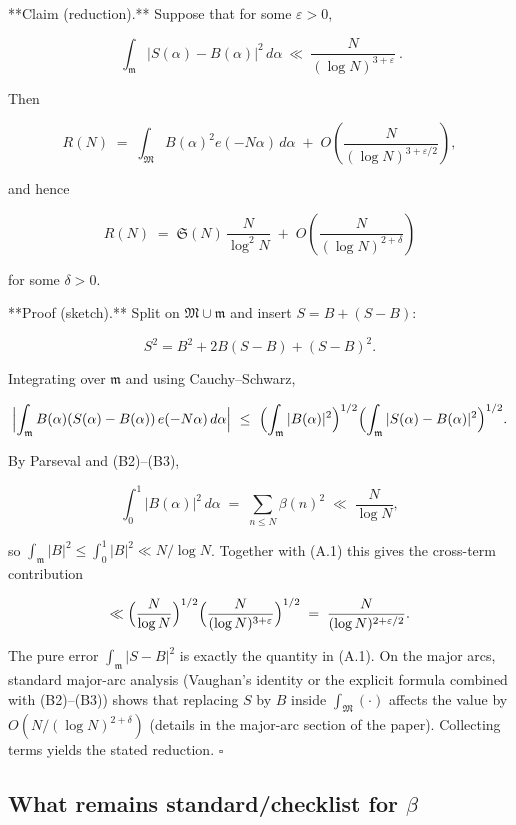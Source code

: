 \documentclass[11pt]{article}
\theoremstyle{definition}
\theoremstyle{remark}
\begin{document}
**Claim (reduction).** Suppose that for some $\varepsilon>0$,

\begin{equation}
\boxed{\ \ \int_{\mathfrak m}\!\bigl|S(\alpha)-B(\alpha)\bigr|^{2}\,d\alpha
\ \ll\ \frac{N}{(\log N)^{3+\varepsilon}}\ .\ }
\tag{A.1}
\end{equation}


Then

$$
R(N)\;=\;\int_{\mathfrak M} B(\alpha)^2 e(-N\alpha)\,d\alpha\;+\;O\!\left(\frac{N}{(\log N)^{3+\varepsilon/2}}\right),
$$

and hence

$$
R(N)\;=\;\mathfrak S(N)\,\frac{N}{\log^{2}N}\;+\;O\!\left(\frac{N}{(\log N)^{2+\delta}}\right)
$$

for some $\delta>0$.

**Proof (sketch).** Split on $\mathfrak M\cup\mathfrak m$ and insert $S=B+(S-B)$:

$$
S^2 = B^2 + 2B(S-B) + (S-B)^2.
$$

Integrating over $\mathfrak m$ and using Cauchy–Schwarz,

$$
\Bigl|\int_{\mathfrak m} B(\alpha)(S(\alpha)-B(\alpha))\,e(-N\alpha)\,d\alpha\Bigr|
\ \le\ \Bigl(\int_{\mathfrak m}|B(\alpha)|^2\Bigr)^{1/2}
      \Bigl(\int_{\mathfrak m}|S(\alpha)-B(\alpha)|^2\Bigr)^{1/2}.
$$

By Parseval and (B2)–(B3),

$$
\int_0^1 |B(\alpha)|^2\,d\alpha \;=\; \sum_{n\le N}\beta(n)^2 \;\ll\; \frac{N}{\log N},
$$

so $\int_{\mathfrak m}|B|^2\le\int_0^1|B|^2\ll N/\log N$. Together with (A.1) this gives the cross-term contribution

$$
\ll \Bigl(\frac{N}{\log N}\Bigr)^{1/2}\Bigl(\frac{N}{(\log N)^{3+\varepsilon}}\Bigr)^{1/2}
\;=\;\frac{N}{(\log N)^{2+\varepsilon/2}}.
$$

The pure error $\int_{\mathfrak m}|S-B|^2$ is exactly the quantity in (A.1). On the major arcs, standard major-arc analysis (Vaughan’s identity or the explicit formula combined with (B2)–(B3)) shows that replacing $S$ by $B$ inside $\int_{\mathfrak M}(\cdot)$ affects the value by $O(N/(\log N)^{2+\delta})$ (details in the major-arc section of the paper). Collecting terms yields the stated reduction. $\square$

\subsection*{What remains standard/checklist for $\beta$}
\end{document}

